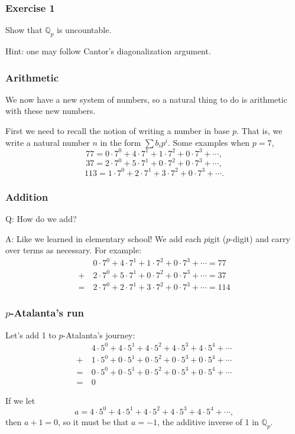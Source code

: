 \documentclass[10pt]{beamer}
\begin{document}
\begin{frame}
    \frametitle{Exercise 1}

    Show that \(\mathbb{Q}_p\) is uncountable.

    Hint: one may follow Cantor's diagonalization argument.

\end{frame}

\begin{frame}
    \frametitle{Arithmetic}

    We now have a new system of numbers, so a natural thing to do is arithmetic with these new numbers.

    First we need to recall the notion of writing a number in base \(p\).
    That is, we write a natural number \(n\) in the form \(\sum b_ip^i\).
    Some examples when \(p=7\), 
    \[77 = 0\cdot 7^0 + 4\cdot 7^1 + 1\cdot 7^2 + 0\cdot 7^3 + \cdots,\]
    \[37 = 2\cdot 7^0 + 5\cdot 7^1 + 0\cdot 7^2 + 0\cdot 7^3 + \cdots,\]
    \[113 = 1\cdot 7^0 + 2\cdot 7^1 + 3\cdot 7^2 + 0\cdot 7^3 + \cdots.\]

\end{frame}

\begin{frame}
    \frametitle{Addition}

    Q: How do we add?
    
    A: Like we learned in elementary school!
    We add each \(p\)igit (\(p\)-digit) and carry over terms as necessary.
    For example:
    \begin{align*}
        &0\cdot 7^0 + 4\cdot 7^1 + 1\cdot 7^2 + 0\cdot 7^3 + \cdots = 77\\
        +\ &2\cdot 7^0 + 5\cdot 7^1 + 0\cdot 7^2 + 0\cdot 7^3 + \cdots = 37\\
        =\ &2\cdot 7^0 + 2\cdot 7^1 + 3\cdot 7^2 + 0\cdot 7^3 + \cdots = 114
    \end{align*}

\end{frame}

\begin{frame}
    \frametitle{\(p\)-Atalanta's run}

    Let's add 1 to \(p\)-Atalanta's journey:
    \begin{align*}
        &4\cdot 5^0 + 4\cdot 5^1 + 4\cdot 5^2 + 4\cdot 5^3 + 4\cdot 5^4 + \cdots\\
        +\ &1\cdot 5^0 + 0\cdot 5^1 + 0\cdot 5^2 + 0\cdot 5^3 + 0\cdot 5^4 + \cdots\\
        =\ &0\cdot 5^0 + 0\cdot 5^1 + 0\cdot 5^2 + 0\cdot 5^3 + 0\cdot 5^4 + \cdots\\
        =\ &0
    \end{align*}

    If we let 
    \[a=4\cdot 5^0 + 4\cdot 5^1 + 4\cdot 5^2 + 4\cdot 5^3 + 4\cdot 5^4 + \cdots,\]
    then \(a+1 = 0\), so it must be that \(a=-1\), the additive inverse of 1 in \(\mathbb{Q}_p\).

\end{frame}
\end{document}
